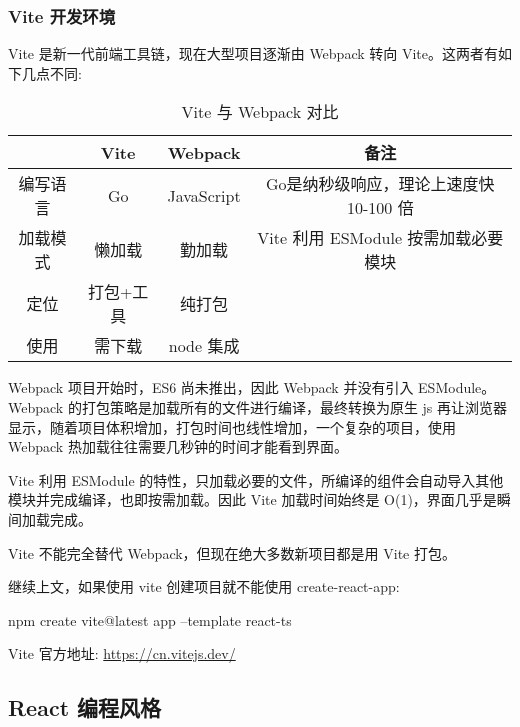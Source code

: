 \subsubsection{Vite 开发环境}

Vite 是新一代前端工具链，现在大型项目逐渐由 Webpack 转向 Vite。这两者有如下几点不同:

\begin{table}[H]
    \centering
    \caption{Vite 与 Webpack 对比}
    \label{table:Vite 与 Webpack 对比}
    \setlength{\tabcolsep}{4mm}
    \begin{tabular}{c|ccc}
        \toprule
        \textbf{} & \textbf{Vite} & \textbf{Webpack} & \textbf{备注} \\
        \midrule
        编写语言 & Go & JavaScript & Go是纳秒级响应，理论上速度快 10-100 倍 \\
        加载模式 & 懒加载 & 勤加载 & Vite 利用 ESModule 按需加载必要模块 \\
        定位 & 打包+工具 & 纯打包 &  \\
        使用 & 需下载 & node 集成 &  \\
        \bottomrule
    \end{tabular}
\end{table}

Webpack 项目开始时，ES6 尚未推出，因此 Webpack 并没有引入 ESModule。Webpack 的打包策略是加载所有的文件进行编译，最终转换为原生 js 再让浏览器显示，随着项目体积增加，打包时间也线性增加，一个复杂的项目，使用 Webpack 热加载往往需要几秒钟的时间才能看到界面。

Vite 利用 ESModule 的特性，只加载必要的文件，所编译的组件会自动导入其他模块并完成编译，也即按需加载。因此 Vite 加载时间始终是 O(1)，界面几乎是瞬间加载完成。

Vite 不能完全替代 Webpack，但现在绝大多数新项目都是用 Vite 打包。

继续上文，如果使用 vite 创建项目就不能使用 create-react-app:

\begin{bash}
npm create vite@latest app --template react-ts
\end{bash}

Vite 官方地址: \url{https://cn.vitejs.dev/}

\subsection{React 编程风格}


